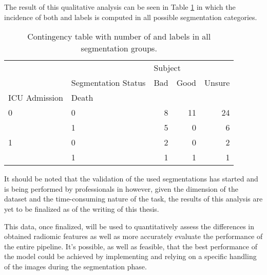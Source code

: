 The result of this qualitative analysis can be seen in Table \ref{tab:ContingencyTableSegm} in which the incidence of both \death and \icu labels is computed in all possible segmentation categories.

\begin{table}
\centering
\caption{Contingency table with number of \death and \icu labels in all segmentation groups. \label{tab:ContingencyTableSegm}}
\begin{tabular}{llrrr}
\toprule
  & {} & \multicolumn{3}{l}{Subject} \\
  & Segmentation Status &     Bad & Good & Unsure \\
ICU Admission & Death &         &      &        \\
\midrule
0 & 0 &       8 &   11 &     24 \\
  & 1 &       5 &    0 &      6 \\
1 & 0 &       2 &    0 &      2 \\
  & 1 &       1 &    1 &      1 \\
\bottomrule
\end{tabular}
\end{table}


It should be noted that the validation of the used segmentations has started and is being performed by professionals in \orsola however, given the dimension of the dataset and the time-consuming nature of the task, the results of this analysis are yet to be finalized as of the writing of this thesis.

This data, once finalized, will be used to quantitatively assess the differences in obtained radiomic features as well as more accurately evaluate the performance of the entire pipeline.
It's possible, as well as feasible, that the best performance of the model could be achieved by implementing and relying on a \covid specific handling of the images during the segmentation phase.



